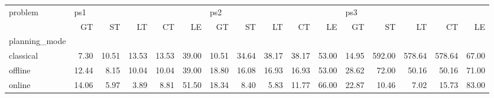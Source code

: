 \begin{tabular}{lrrrrrrrrrrrrrrr}
\toprule
problem & \multicolumn{5}{l}{ps1} & \multicolumn{5}{l}{ps2} & \multicolumn{5}{l}{ps3} \\
{} &    GT &    ST &    LT &    CT &    LE &    GT &    ST &    LT &    CT &    LE &    GT &     ST &     LT &     CT &    LE \\
planning\_mode &       &       &       &       &       &       &       &       &       &       &       &        &        &        &       \\
\midrule
classical     &  7.30 & 10.51 & 13.53 & 13.53 & 39.00 & 10.51 & 34.64 & 38.17 & 38.17 & 53.00 & 14.95 & 592.00 & 578.64 & 578.64 & 67.00 \\
offline       & 12.44 &  8.15 & 10.04 & 10.04 & 39.00 & 18.80 & 16.08 & 16.93 & 16.93 & 53.00 & 28.62 &  72.00 &  50.16 &  50.16 & 71.00 \\
online        & 14.06 &  5.97 &  3.89 &  8.81 & 51.50 & 18.34 &  8.40 &  5.83 & 11.77 & 66.00 & 22.87 &  10.46 &   7.02 &  15.73 & 83.00 \\
\bottomrule
\end{tabular}
